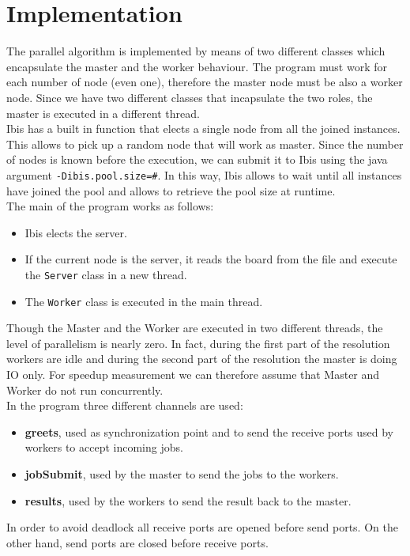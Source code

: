 \documentclass{article}
\begin{document}
\section{Implementation}
The parallel algorithm is implemented by means of two different classes which encapsulate the master and the worker behaviour. The program must work for each number of node (even one), therefore the master node must be also a worker node. Since we have two different classes that incapsulate the two roles, the master is executed in a different thread. \\
Ibis has a built in function that elects a single node from all the joined instances. This allows to pick up a random node that will work as master. Since the number of nodes is known before the execution, we can submit it to Ibis using the java argument \texttt{-Dibis.pool.size=\#}. In this way, Ibis allows to wait until all instances have joined the pool and allows to retrieve the pool size at runtime. \\
The main of the program works as follows:
\begin{itemize}
    \item Ibis elects the server.
    \item If the current node is the server, it reads the board from the file and execute the \texttt{Server} class in a new thread.
    \item The \texttt{Worker} class is executed in the main thread.
\end{itemize}
Though the Master and the Worker are executed in two different threads, the level of parallelism is nearly zero. In fact, during the first part of the resolution workers are idle and during the second part of the resolution the master is doing IO only. For speedup measurement we can therefore assume that Master and Worker do not run concurrently. \\
In the program three different channels are used:
\begin{itemize}
    \item \textbf{greets}, used as synchronization point and to send the receive ports used by workers to accept incoming jobs.
    \item \textbf{jobSubmit}, used by the master to send the jobs to the workers.
    \item \textbf{results}, used by the workers to send the result back to the master.
\end{itemize}
In order to avoid deadlock all receive ports are opened before send ports. On the other hand, send ports are closed before receive ports.
\end{document}
